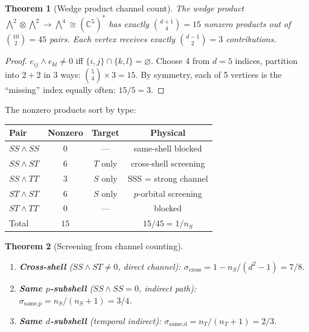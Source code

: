 \documentclass[12pt]{article}
\newtheorem{theorem}{Theorem}[section]
\theoremstyle{remark}
\theoremstyle{definition}
\newcommand{\CC}{\mathbb{C}}
\begin{document}
\begin{theorem}[Wedge product channel count]
\label{thm:wedge_count}
The wedge product $\bigwedge^2 \otimes \bigwedge^2 \to \bigwedge^4 \cong (\CC^5)^*$ has exactly $\binom{d+1}{4} = 15$ nonzero products out of $\binom{10}{2} = 45$ pairs.  Each vertex receives exactly $\binom{d-1}{2} = 3$ contributions.
\end{theorem}

\begin{proof}
$e_{ij} \wedge e_{kl} \neq 0$ iff $\{i,j\} \cap \{k,l\} = \varnothing$.  Choose 4 from $d=5$ indices, partition into $2{+}2$ in $3$ ways: $\binom{5}{4} \times 3 = 15$.  By symmetry, each of 5 vertices is the ``missing'' index equally often: $15/5 = 3$.
\end{proof}

The nonzero products sort by type:
\begin{center}
\begin{tabular}{lccc}
\hline
Pair & Nonzero & Target & Physical \\
\hline
$SS \wedge SS$ & $0$ & --- & same-shell blocked \\
$SS \wedge ST$ & $6$ & $T$ only & cross-shell screening \\
$SS \wedge TT$ & $3$ & $S$ only & SSS = strong channel \\
$ST \wedge ST$ & $6$ & $S$ only & $p$-orbital screening \\
$ST \wedge TT$ & $0$ & --- & blocked \\
\hline
Total & $15$ & & $15/45 = 1/n_S$ \\
\hline
\end{tabular}
\end{center}

\begin{theorem}[Screening from channel counting]
\label{thm:sigma_wedge}
\leavevmode
\begin{enumerate}
\item \textbf{Cross-shell} ($SS \wedge ST \neq 0$, direct channel):
$\sigma_\text{cross} = 1 - n_S/(d^2\!-\!1) = 7/8$.

\item \textbf{Same $p$-subshell} ($SS \wedge SS = 0$, indirect path):
$\sigma_\text{same,p} = n_S/(n_S\!+\!1) = 3/4$.

\item \textbf{Same $d$-subshell} (temporal indirect):
$\sigma_\text{same,d} = n_T/(n_T\!+\!1) = 2/3$.
\end{enumerate}
\end{theorem}
\end{document}
